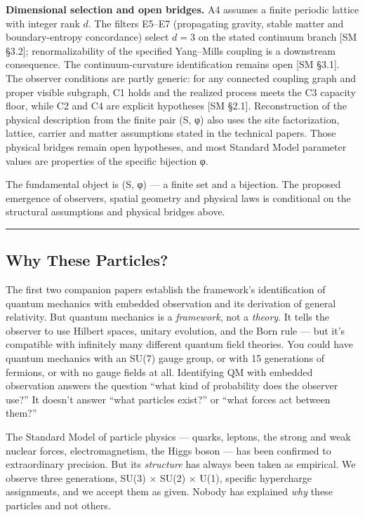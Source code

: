 \documentclass[
]{article}
\begin{document}
\textbf{Dimensional selection and open bridges.} A4 assumes a finite
periodic lattice with integer rank \(d\). The filters E5--E7
(propagating gravity, stable matter and boundary-entropy concordance)
select \(d = 3\) on the stated continuum branch {[}SM §3.2{]};
renormalizability of the specified Yang--Mills coupling is a downstream
consequence. The continuum-curvature identification remains open {[}SM
§3.1{]}. The observer conditions are partly generic: for any connected
coupling graph and proper visible subgraph, C1 holds and the realized
process meets the C3 capacity floor, while C2 and C4 are explicit
hypotheses {[}SM §2.1{]}. Reconstruction of the physical description
from the finite pair (S, φ) also uses the site factorization, lattice,
carrier and matter assumptions stated in the technical papers. Those
physical bridges remain open hypotheses, and most Standard Model
parameter values are properties of the specific bijection φ.

The fundamental object is (S, φ) --- a finite set and a bijection. The
proposed emergence of observers, spatial geometry and physical laws is
conditional on the structural assumptions and physical bridges above.

\begin{center}\rule{0.5\linewidth}{0.5pt}\end{center}

\hypertarget{why-these-particles}{%
\subsection{Why These Particles?}\label{why-these-particles}}

The first two companion papers establish the framework's identification
of quantum mechanics with embedded observation and its derivation of
general relativity. But quantum mechanics is a \emph{framework}, not a
\emph{theory}. It tells the observer to use Hilbert spaces, unitary
evolution, and the Born rule --- but it's compatible with infinitely
many different quantum field theories. You could have quantum mechanics
with an SU(7) gauge group, or with 15 generations of fermions, or with
no gauge fields at all. Identifying QM with embedded observation answers
the question ``what kind of probability does the observer use?'' It
doesn't answer ``what particles exist?'' or ``what forces act between
them?''

The Standard Model of particle physics --- quarks, leptons, the strong
and weak nuclear forces, electromagnetism, the Higgs boson --- has been
confirmed to extraordinary precision. But its \emph{structure} has
always been taken as empirical. We observe three generations, SU(3) ×
SU(2) × U(1), specific hypercharge assignments, and we accept them as
given. Nobody has explained \emph{why} these particles and not others.
\end{document}
